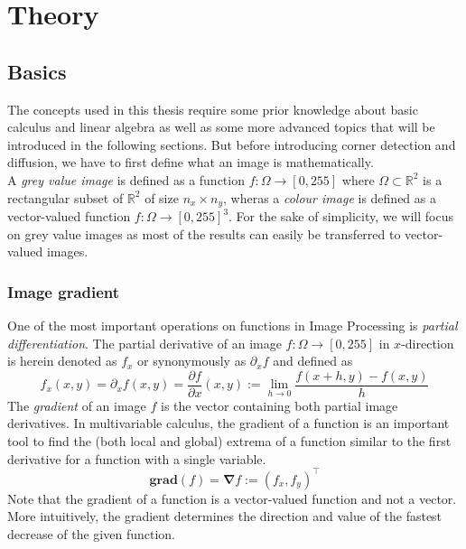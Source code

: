 \chapter{Theory}\label{ch:Theory}

\section{Basics}\label{sec:Basics}
The concepts used in this thesis require some prior knowledge about basic calculus and linear
algebra as well as some more advanced topics that will be introduced in the following sections.
But before introducing corner detection and diffusion, we have to first define what an image is
mathematically.\\
A \textit{grey value image} is defined as a function $f: \Omega \rightarrow [0, 255]$ where
$\Omega \subset \mathbb{R}^2$ is a rectangular subset of $\mathbb{R}^2$ of size $n_x\times n_y$,
wheras a
\textit{colour image} is defined as a vector-valued function $f: \Omega \rightarrow [0, 255]^3$.
For the sake of simplicity, we will focus on grey value images as most of the results can easily be
transferred to vector-valued images.

\subsection{Image gradient}
One of the most important operations on functions in Image Processing is \textit{partial
    differentiation}.
The partial derivative of an image $f: \Omega \rightarrow [0, 255]$ in $x$-direction is herein denoted as $f_x$ or
synonymously as $\partial_x f$ and defined as
\begin{equation}
    f_x(x, y) = \partial_x f (x, y) = \frac{\partial f}{\partial x} (x, y) := \lim_{h \to 0}\frac{f(x+h, y) -f(x, y)}{h} 
\end{equation}
The \textit{gradient} of an image $f$ is the vector containing both partial image derivatives.
In multivariable calculus, the gradient of a function is an important tool to find the (both local
and global) extrema of a function similar to the first derivative for a function with a single
variable.
\begin{equation}
    \textbf{grad}(f) = \boldsymbol\nabla f := \left(f_x, f_y\right)^\top
\end{equation}
Note that the gradient of a function is a vector-valued function and not a vector.
More intuitively, the gradient determines the direction and value of the fastest decrease of the
given function.


